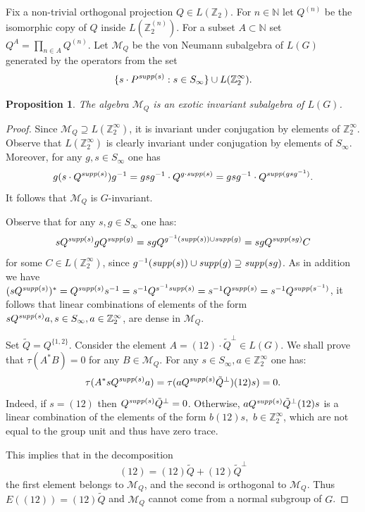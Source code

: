 \documentclass[11pt]{amsart}
\newcommand{\suppg}{{\it supp}}
\theoremstyle{plain}
\newtheorem{proposition}[theorem]{Proposition}
\theoremstyle{definition}
\theoremstyle{remark}
\numberwithin{equation}{section}
\begin{document}
\medskip



Fix a non-trivial orthogonal projection $Q\in L(\mathbb Z_2)$. For $n\in\mathbb N$ let $Q^{(n)}$ be the isomorphic copy of $Q$ inside $L(\mathbb Z_2^{(n)})$. For a subset $A\subset\mathbb N$ set $Q^A=\prod\limits_{n\in A}Q^{(n)}$. Let $\mathcal M_Q$ be the von Neumann subalgebra of $L(G)$ generated by the operators from the set \begin{equation}\label{equation: definition of M_P}
	\{s\cdot P^{\suppg(s)}:s\in S_\infty\}\cup L(\mathbb Z_2^\infty).\end{equation}
\begin{proposition}
	The algebra $\mathcal M_Q$ is an exotic invariant subalgebra of $L(G)$.   
\end{proposition}
\begin{proof}
Since $\mathcal M_Q \supseteq L(\mathbb Z_2^\infty)$, it is invariant under conjugation by elements of $\mathbb{Z}_2^\infty$. Observe that $L(\mathbb Z_2^\infty)$ is clearly invariant under conjugation by elements of $S_\infty$. Moreover, for any $g,s\in S_\infty$ one has 
$$g(s\cdot Q^{\suppg(s)})g^{-1}=gsg^{-1}\cdot Q^{g\cdot\suppg(s)}=gsg^{-1}\cdot Q^{\suppg(gsg^{-1})}.$$ 
It follows that $\mathcal M_Q$ is $G$-invariant.

Observe that for any $s,g\in S_\infty$ one has: 
$$sQ^{\suppg(s)}gQ^{\suppg(g)}= sgQ^{g^{-1}(\suppg(s))\cup \suppg(g)}=sgQ^{\suppg(sg)}C$$ 
for some $C\in L(\mathbb{Z}_2^\infty)$, since $g^{-1}(\suppg(s))\cup \suppg(g)\supseteq \suppg(sg)$. As in addition we have $(sQ^{\suppg(s)})^* = Q^{\suppg(s)} s^{-1} = s^{-1} Q^{s^{-1} \suppg(s)} = s^{-1} Q^{\suppg(s)} = s^{-1} Q^{ \suppg(s^{-1})}$, 
it follows that linear combinations of elements of the form $sQ^{\suppg(s)}a,s\in S_\infty,a\in \mathbb Z_2^\infty$, are dense in $\mathcal M_Q$.
	
Set $\tilde{Q} = Q^{\{1,2\}}$. Consider the element $A=(12)\cdot \tilde{Q}^\perp\in L(G)$. We shall prove that $\tau(A^*B)=0$ for any $B\in \mathcal M_Q$.  For any $s\in S_\infty,a\in \mathbb Z_2^\infty$ one has:
$$\tau(A^*sQ^{\suppg(s)}a)=\tau(aQ^{\suppg(s)}\tilde{Q}^{\perp})(12)s)=0.$$ 
Indeed, if $s=(12)$ then $Q^{\suppg(s)}\tilde{Q}^{\perp}=0$. Otherwise, $aQ^{\suppg(s)}\tilde{Q}^{\perp}(12)s$ is a linear combination of the elements of the form $b(12)s,$ $b\in \mathbb Z_2^\infty$, which are not equal to the group unit and thus have zero trace.

This implies that in the decomposition 
\[ (12) = (12) \tilde{Q} + (12) \tilde{Q}^\perp\]
the first element belongs to $\mathcal{M}_Q$, and the second is orthogonal to $\mathcal{M}_Q$. Thus
$E((12)) = (12) \tilde{Q}$ and $\mathcal{M}_Q$ cannot come from a normal subgroup of $G$.
\end{proof}	
\end{document}
